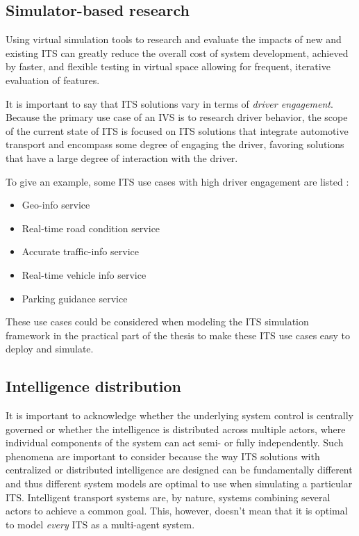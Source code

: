 \documentclass[0main.tex]{subfiles}
\begin{document}
\subsection{Simulator-based research}

Using virtual simulation tools to research and evaluate the impacts of new and existing ITS 
can greatly reduce the overall cost of system development, achieved by faster, 
and flexible testing in virtual space allowing for frequent, iterative evaluation of features.

It is important to say that ITS solutions vary in terms of \emph{driver engagement}. Because
the primary use case of an IVS is to research driver behavior, the scope of the current state
of ITS is focused on ITS solutions that integrate automotive transport and encompass some
degree of engaging the driver, favoring solutions that have a large degree of interaction with
the driver.

To give an example, some ITS use cases with high driver engagement are listed \cite{Lishchenko2021}:

\begin{itemize}
    \item Geo-info service
    \item Real-time road condition service 
    \item Accurate traffic-info service 
    \item Real-time vehicle info service 
    \item Parking guidance service
\end{itemize}

These use cases could be considered when modeling the ITS simulation framework in the practical part of the 
thesis to make these ITS use cases easy to deploy and simulate.

\subsection{Intelligence distribution} \label{mas-compatibility}

It is important to acknowledge whether the underlying system control is centrally governed 
or whether the intelligence is distributed across multiple actors, where individual 
components of the system can act semi- or fully independently.
Such phenomena are important to consider because the way ITS solutions 
with centralized or distributed intelligence are designed can be fundamentally different 
and thus different system models are optimal to use when simulating a particular ITS. 
Intelligent transport systems are, by nature, systems combining several actors to
achieve a common goal. This, however, doesn't mean that it is optimal to model \emph{every} ITS 
as a multi-agent system. 
\end{document}
